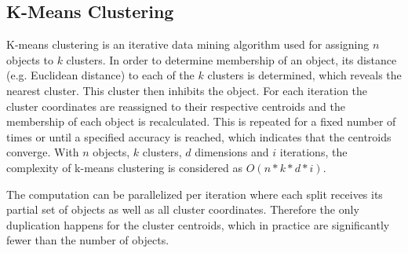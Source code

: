 \subsection*{K-Means Clustering}

K-means clustering is an iterative data mining algorithm used for assigning $n$ objects to $k$ clusters\cite{kmeans_paper}. In order to determine membership of an object, its distance (e.g. Euclidean distance) to each of the $k$ clusters is determined, which reveals the nearest cluster. This cluster then inhibits the object. For each iteration the cluster coordinates are reassigned to their respective centroids and the membership of each object is recalculated. This is repeated for a fixed number of times or until a specified accuracy is reached, which indicates that the centroids converge. With $n$ objects, $k$ clusters, $d$ dimensions and $i$ iterations, the complexity of k-means clustering is considered as $O(n*k*d*i)$.

The computation can be parallelized per iteration where each split receives its partial set of objects as well as all cluster coordinates. Therefore the only duplication happens for the cluster centroids, which in practice are significantly fewer than the number of objects.
